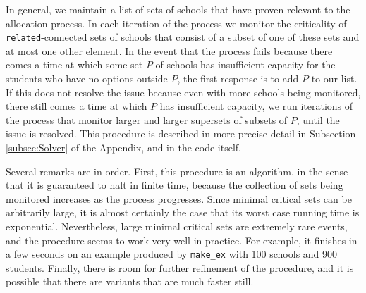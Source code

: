 \documentclass[12pt]{article}
\theoremstyle{definition}
\begin{document}
In general, we maintain a list of sets of schools that have proven
relevant to the allocation process.  In each iteration of the process
we monitor the criticality of \texttt{related}-connected sets of
schools that consist of a subset of one of these sets and at most one
other element.  In the event that the process fails because there
comes a time at which some set $P$ of schools has insufficient
capacity for the students who have no options outside $P$, the first
response is to add $P$ to our list.  If this does not resolve the
issue because even with more schools being monitored, there still
comes a time at which $P$ has insufficient capacity, we run iterations
of the process that monitor larger and larger supersets of subsets of
$P$, until the issue is resolved.  This procedure is described in more
precise detail in Subsection \ref{subsec:Solver} of the Appendix, and
in the code itself.

Several remarks are in order.  First, this procedure is an algorithm,
in the sense that it is guaranteed to halt in finite time, because the
collection of sets being monitored increases as the process
progresses.  Since minimal critical sets can be arbitrarily large, it
is almost certainly the case that its worst case running time is
exponential.  Nevertheless, large minimal critical sets are extremely
rare events, and the procedure seems to work very well in practice.
For example, it finishes in a few seconds on an example produced by
\texttt{make\_ex} with 100 schools and 900 students.  Finally, there
is room for further refinement of the procedure, and it is possible
that there are variants that are much faster still.



\end{document}
